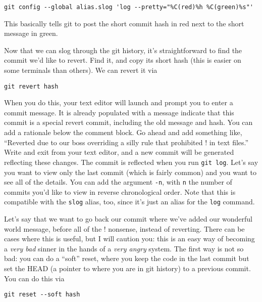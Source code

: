 \begin{verbatim}
git config --global alias.slog 'log --pretty="%C(red)%h %C(green)%s"'
\end{verbatim}

\par{
This basically tells git to post the short commit hash in red next to the
short message in green. 

\par{
Now that we can slog through the git history, it's straightforward to find the
commit we'd like to revert. Find it, and copy its short hash (this is easier
on some terminals than others). We can revert it via 
}

\begin{verbatim}
git revert hash
\end{verbatim}

\par{
When you do this, your text editor will launch and prompt you to enter a
commit message. It is already populated with a message indicate that this
commit is a special revert commit, including the old message and hash. You can
add a rationale below the comment block. Go ahead and add something like,
``Reverted due to our boss overriding a silly rule that prohibited ! in text
files.'' Write and exit from your text editor, and a new commit will be
generated reflecting these changes. The commit is reflected when you run
\verb+git log+. Let's say you want to view only the last commit (which is
fairly common) and you want to see all of the details. You can add the
argument \verb+-n+, with \verb+n+ the number of commits you'd like to view in
reverse chronological order. Note that this is compatible with the
\verb+slog+ alias, too, since it's just an alias for the \verb+log+ command. 
}

\par{
Let's say that we want to go back our commit where we've added our wonderful
world message, before all of the ! nonsense, instead of reverting. There can
be cases where this is useful, but I will caution you: this is an easy way of
becoming a \emph{very bad} sinner in the hands of a \emph{very angry} system.
The first way is not so bad: you can do a ``soft'' reset, where you keep the
code in the last commit but set the HEAD (a pointer to where you are in git
history) to a previous commit. You can do this via
}

\begin{verbatim}
git reset --soft hash
\end{verbatim}

}

